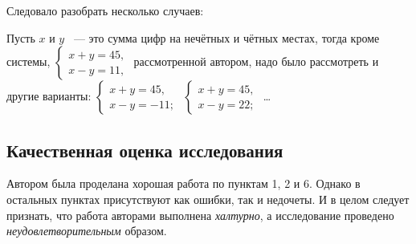 \documentclass[12pt,twoside]{article}
\begin{document}
Следовало разобрать несколько случаев:

Пусть $x$ и $y$ ~--- это сумма цифр на нечётных и чётных местах, тогда кроме системы, $\begin{cases}
	x+y=45,\\
	x-y=11,
\end{cases}$ рассмотренной автором, надо было рассмотреть и другие варианты:
$\begin{cases}
	x+y=45,\\
	x-y=-11;
\end{cases}$
$\begin{cases}
	x+y=45,\\
	x-y=22;
\end{cases}$ \ldots


\subsection*{Качественная оценка исследования}
Автором была проделана хорошая работа по пунктам 1, 2 и 6. Однако в остальных пунктах присутствуют как ошибки, так и недочеты. И в целом следует признать, что работа авторами выполнена \textit{халтурно}, а исследование проведено  \textit{неудовлетворительным} образом.
\end{document}
